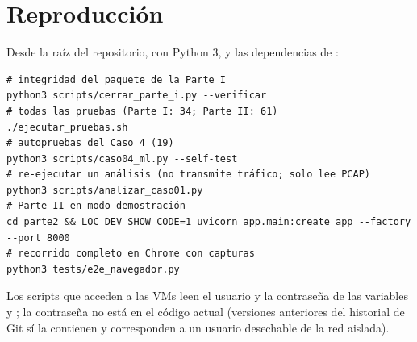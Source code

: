 \chapter{Reproducción}
Desde la raíz del repositorio, con Python 3,  y las dependencias de :
\begin{lstlisting}
# integridad del paquete de la Parte I
python3 scripts/cerrar_parte_i.py --verificar
# todas las pruebas (Parte I: 34; Parte II: 61)
./ejecutar_pruebas.sh
# autopruebas del Caso 4 (19)
python3 scripts/caso04_ml.py --self-test
# re-ejecutar un análisis (no transmite tráfico; solo lee PCAP)
python3 scripts/analizar_caso01.py
# Parte II en modo demostración
cd parte2 && LOC_DEV_SHOW_CODE=1 uvicorn app.main:create_app --factory --port 8000
# recorrido completo en Chrome con capturas
python3 tests/e2e_navegador.py
\end{lstlisting}
Los scripts que acceden a las VMs leen el usuario y la contraseña de las variables  y ; la contraseña no está en el código actual (versiones anteriores del historial de Git sí la contienen y corresponden a un usuario desechable de la red aislada).

